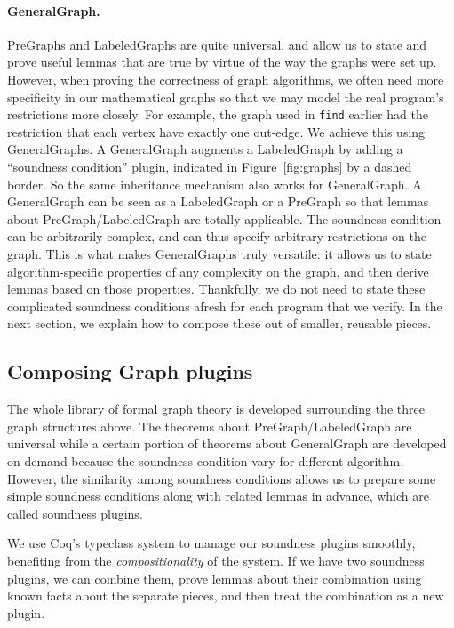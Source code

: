\vspace{-0.75ex}
\paragraph{GeneralGraph.}
PreGraphs and LabeledGraphs are quite universal, and allow us to state
and prove useful lemmas that are true by virtue of the way the graphs
were set up. However, when proving the correctness of graph
algorithms, we often need more specificity in our mathematical graphs
so that we may model the real program's restrictions more closely.
For example, the graph used in \texttt{find} earlier had the
restriction that each vertex have exactly one out-edge.  We achieve
this using GeneralGraphs. A GeneralGraph augments a LabeledGraph by
adding a ``soundness condition'' plugin, indicated in
Figure~\ref{fig:graphs} by a dashed border. So the same inheritance
mechanism also works for GeneralGraph. A GeneralGraph can be seen as a
LabeledGraph or a PreGraph so that lemmas about PreGraph/LabeledGraph
are totally applicable. The soundness condition can be arbitrarily
complex, and can thus specify arbitrary restrictions on the graph.
This is what makes GeneralGraphs truly versatile: it allows us to
state algorithm-specific properties of any complexity on the graph,
and then derive lemmas based on those properties.  Thankfully, we do
not need to state these complicated soundness conditions afresh for
each program that we verify. In the next section, we explain how to
compose these out of smaller, reusable pieces.

\subsection{Composing Graph plugins}
\label{subsec:graphplugins}

The whole library of formal graph theory is developed surrounding the
three graph structures above. The theorems about PreGraph/LabeledGraph
are universal while a certain portion of theorems about GeneralGraph
are developed on demand because the soundness condition vary for
different algorithm. However, the similarity among soundness
conditions allows us to prepare some simple soundness conditions along
with related lemmas in advance, which are called soundness plugins.

We use Coq's typeclass system to manage our soundness plugins
smoothly, benefiting from the \emph{compositionality} of the system.
If we have two soundness plugins, we can combine them, prove lemmas
about their combination using known facts about the separate pieces,
and then treat the combination as a new plugin.

